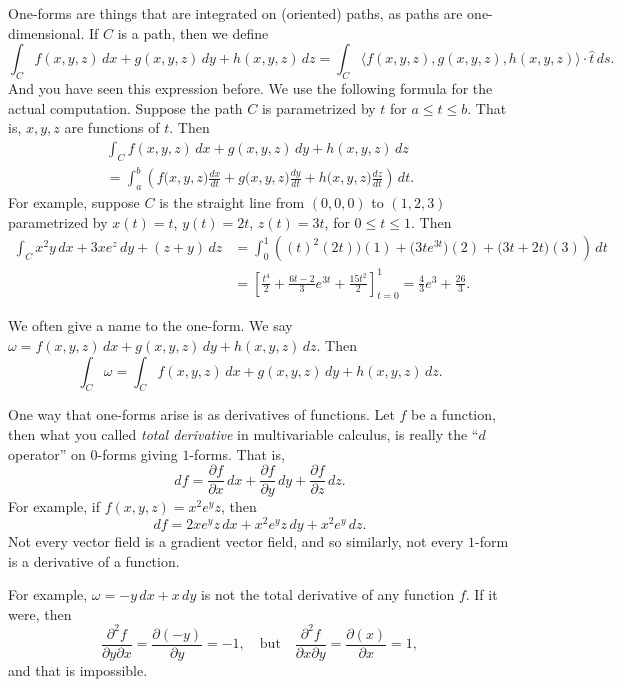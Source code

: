 \documentclass[12pt]{article}
\begin{document}
One-forms are things that are integrated on (oriented) paths, as paths are
one-dimensional.  If $C$ is a path, then we define 
\[
\int_C
f(x,y,z) \, dx + 
g(x,y,z) \, dy + 
h(x,y,z) \, dz 
=
\int_C
\langle f(x,y,z) , g(x,y,z) , h(x,y,z) \rangle \cdot \hat{t} \, ds .
\]
And you have seen this expression before.
We use the following formula for the actual computation.
Suppose the path $C$ is parametrized by $t$
for $a \leq t \leq b$.  That is, $x,y,z$ are functions of $t$.  Then
\begin{multline} \label{eq:oneformev}
\int_C
f(x,y,z) \, dx + 
g(x,y,z) \, dy + 
h(x,y,z) \, dz 
\\
=
\int_a^b 
\left( f\bigl(x,y,z\bigr) \frac{d x}{d t}
+
g\bigl(x,y,z\bigr) \frac{d y}{d t}
+ 
h\bigl(x,y,z\bigr) \frac{d z}{d t}
\right) \, dt.
\end{multline}
For example, suppose $C$ is the straight line from $(0,0,0)$ to $(1,2,3)$
parametrized by $x(t) = t$, $y(t) = 2t$, $z(t) = 3t$, for $0 \leq t \leq 1$.
Then
\begin{equation*}
\begin{split}
\int_C
x^2y \, dx + 
3xe^z \, dy + 
(z+y) \, dz 
& =
\int_0^1 
\left( (t)^2 (2t) \bigr) (1)
+
\bigl(3te^{3t} \bigr) (2)
+ 
\bigl(3t+2t\bigr) (3)
\right) \, dt
\\
& = \left[
\frac{t^4}{2}
+
\frac{6t-2}{3} e^{3t}
+
\frac{15t^2}{2}
\right]_{t=0}^1
=
\frac{4}{3} e^3 + \frac{26}{3} .
\end{split}
\end{equation*}

We often give a name to the one-form.  We say
$\omega = f(x,y,z) \, dx + g(x,y,z) \, dy + h(x,y,z) \, dz$.
Then
\[
\int_C \omega = 
\int_C
f(x,y,z) \, dx + 
g(x,y,z) \, dy + 
h(x,y,z) \, dz .
\]

One way that one-forms arise is as derivatives of functions.
Let $f$ be a function, then what you called
\emph{total derivative}
in multivariable calculus,
is really the ``$d$ operator'' on $0$-forms giving $1$-forms.  That
is,
\[
df =
\frac{\partial f}{\partial x}\, dx + 
\frac{\partial f}{\partial y}\, dy + 
\frac{\partial f}{\partial z}\, dz .
\]
For example, if $f(x,y,z) = x^2e^yz$, then
\[
df = 
2xe^y z\, dx + 
x^2e^yz\, dy + 
x^2e^y\, dz .
\]
Not every vector field is a gradient vector field, and so
similarly, not every $1$-form is a derivative of a function.

For example, $\omega = -y\, dx + x \, dy$ is not the total derivative
of any function $f$.  If it were, then
\begin{equation*}
\frac{\partial^2 f}{\partial y \partial x} = 
\frac{\partial (-y)}{\partial y} = -1,
\quad \text{but} \quad 
\frac{\partial^2 f}{\partial x \partial y} = 
\frac{\partial (x)}{\partial x} = 1,
\end{equation*}
and that is impossible.
\end{document}
